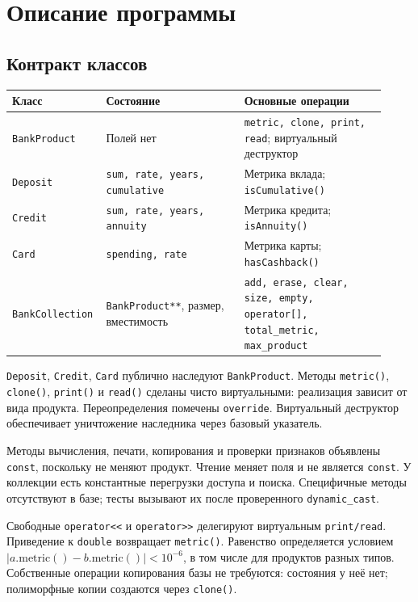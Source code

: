 \section{Описание программы}

\subsection{Контракт классов}
\begin{center}
\small
\begin{tabular}{@{}>{\raggedright\arraybackslash}p{0.19\linewidth}>{\raggedright\arraybackslash}p{0.36\linewidth}>{\raggedright\arraybackslash}p{0.37\linewidth}@{}}
\toprule
Класс & Состояние & Основные операции \\
\midrule
\texttt{BankProduct} & Полей нет & \texttt{metric, clone, print, read}; виртуальный деструктор \\
\texttt{Deposit} & \texttt{sum, rate, years, cumulative} & Метрика вклада; \texttt{isCumulative()} \\
\texttt{Credit} & \texttt{sum, rate, years, annuity} & Метрика кредита; \texttt{isAnnuity()} \\
\texttt{Card} & \texttt{spending, rate} & Метрика карты; \texttt{hasCashback()} \\
\texttt{BankCollection} & \texttt{BankProduct**}, размер, вместимость & \texttt{add, erase, clear, size, empty, operator[], total\_metric, max\_product} \\
\bottomrule
\end{tabular}
\end{center}

\texttt{Deposit}, \texttt{Credit}, \texttt{Card} публично наследуют \texttt{BankProduct}. Методы \texttt{metric()}, \texttt{clone()}, \texttt{print()} и \texttt{read()} сделаны чисто виртуальными: реализация зависит от вида продукта. Переопределения помечены \texttt{override}. Виртуальный деструктор обеспечивает уничтожение наследника через базовый указатель.

Методы вычисления, печати, копирования и проверки признаков объявлены \texttt{const}, поскольку не меняют продукт. Чтение меняет поля и не является \texttt{const}. У коллекции есть константные перегрузки доступа и поиска. Специфичные методы отсутствуют в базе; тесты вызывают их после проверенного \texttt{dynamic\_cast}.

Свободные \texttt{operator<<} и \texttt{operator>>} делегируют виртуальным \texttt{print/read}. Приведение к \texttt{double} возвращает \texttt{metric()}. Равенство определяется условием
$|a.\mathrm{metric()}-b.\mathrm{metric()}|<10^{-6}$, в том числе для продуктов разных типов. Собственные операции копирования базы не требуются: состояния у неё нет; полиморфные копии создаются через \texttt{clone()}.

